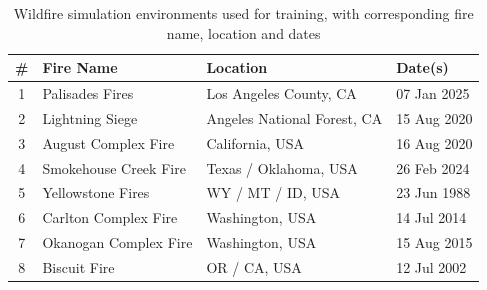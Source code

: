 \documentclass[conference]{IEEEtran}
\begin{document}

\begin{table}[h!]
\centering
\caption{Wildfire simulation environments used for training, with corresponding fire name, location and dates}
\label{tab:wildfire_envs_details}
\renewcommand{\arraystretch}{1.2}
\begin{tabular}{|c|p{2.5cm}|p{3cm}|p{1.5cm}|}
\hline
\textbf{\#} & \textbf{Fire Name} & \textbf{Location} & \textbf{Date(s)} \\
\hline
1 & Palisades Fires & Los Angeles County, CA & 07 Jan 2025\\
\hline
2 & Lightning Siege & Angeles National Forest, CA & 15 Aug 2020\\
\hline
3 & August Complex Fire & California, USA & 16 Aug 2020\\
\hline
4 & Smokehouse Creek Fire & Texas / Oklahoma, USA & 26 Feb 2024\\
\hline
5 & Yellowstone Fires & WY / MT / ID, USA & 23 Jun 1988\\
\hline
6 & Carlton Complex Fire & Washington, USA & 14 Jul 2014\\
\hline
7 & Okanogan Complex Fire & Washington, USA & 15 Aug 2015\\
\hline
8 & Biscuit Fire & OR / CA, USA & 12 Jul 2002\\
\hline
\end{tabular}
\label{tab:wildfire-envs}
\end{table}

\end{document}

